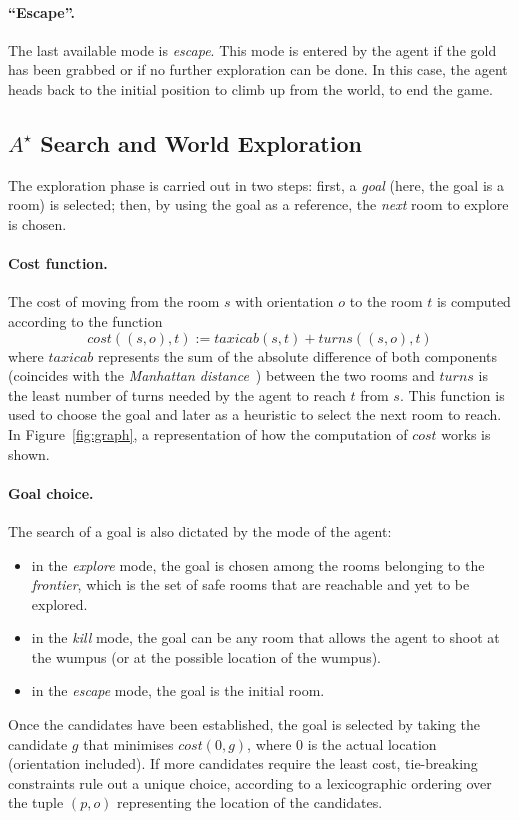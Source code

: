 \documentclass{llncs}
\begin{document}
\paragraph{\enquote{Escape}.} The last available mode is \emph{escape}.
This mode is entered by the agent if the gold has been grabbed or if no further exploration can be done.
In this case, the agent heads back to the initial position to climb up from the world, to end the game.

\subsection{$A^{\star}$ Search and World Exploration}

The exploration phase is carried out in two steps: first, a \emph{goal} (here, the goal is a room) is selected; then, by using the goal as a reference, the \emph{next} room to explore is chosen.

\paragraph{Cost function.} The cost of moving from the room $s$ with orientation $o$ to the room $t$ is computed according to the function
\begin{equation}
	cost((s,o),t) := taxicab(s,t) + turns((s,o),t)
\end{equation}
where $taxicab$ represents the sum of the absolute difference of both components (coincides with the \emph{Manhattan distance}~\cite{Manhattan}) between the two rooms and $turns$ is the least number of turns needed by the agent to reach $t$ from $s$.
This function is used to choose the goal and later as a heuristic to select the next room to reach.
In Figure~\ref{fig:graph}, a representation of how the computation of $cost$ works is shown.

\paragraph{Goal choice.} The search of a goal is also dictated by the mode of the agent:
\begin{itemize}
	\item in the \emph{explore} mode, the goal is chosen among the rooms belonging to the \emph{frontier}, which is the set of safe rooms that are reachable and yet to be explored.
	\item in the \emph{kill} mode, the goal can be any room that allows the agent to shoot at the wumpus (or at the possible location of the wumpus).
	\item in the \emph{escape} mode, the goal is the initial room.
\end{itemize}
Once the candidates have been established, the goal is selected by taking the candidate $g$ that minimises $cost(0,g)$, where $0$ is the actual location (orientation included).
If more candidates require the least cost, tie-breaking constraints rule out a unique choice, according to a lexicographic ordering over the tuple $(p,o)$ representing the location of the candidates.
\end{document}
